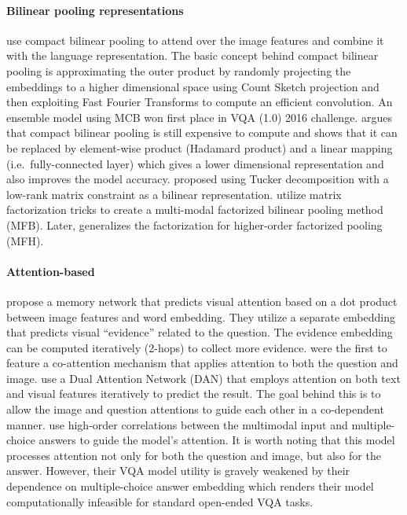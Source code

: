 \documentclass[times,twocolumn, final ,authoryear]{elsarticle}
\begin{document}
  \paragraph{Bilinear pooling representations}\citet{fukui2016} use compact bilinear pooling to attend over the image features and combine it with the language representation. The basic concept behind compact bilinear pooling is approximating
  the outer product by randomly projecting the embeddings to a higher
  dimensional space using Count Sketch projection \citep{charikar2004} and then exploiting
  Fast Fourier Transforms to compute an efficient convolution. An ensemble model using MCB won first place in VQA (1.0) 2016 challenge.
  \citet{kim2016b} argues that compact bilinear pooling is still expensive
  to compute and shows that it can be replaced by element-wise product (Hadamard product) and a linear mapping (i.e.\ fully-connected layer) which gives a lower dimensional representation and also improves the model accuracy.
  \citet{ben-younes2017} proposed using Tucker decomposition \citep{tucker1966} with a low-rank matrix constraint as a bilinear representation. \cite{yu2017a} utilize matrix factorization tricks to create a multi-modal factorized bilinear pooling method (MFB). Later, \cite{yu2017} generalizes the factorization for higher-order factorized pooling (MFH).
  
  \paragraph{Attention-based}
  \cite{xu2015} propose a memory network that predicts visual attention based on a dot product between image features and word embedding. They utilize a separate embedding that predicts visual ``evidence'' related to the question. The evidence embedding can be computed iteratively (2-hops) to collect more evidence.
  \citet{lu2016} were the first to feature
  a co-attention mechanism that applies attention to both the question
  and image. \citet{nam2016b} use a Dual Attention Network (DAN) that
  employs attention on both text and visual features iteratively to predict the result. The goal behind this is to allow the image and question attentions to guide each other in a co-dependent manner. \cite{schwartz2017} use high-order correlations between the multimodal input and multiple-choice answers to guide the model's attention. It is worth noting that this model processes attention not only for both the question and image, but also for the answer. However, their VQA model utility is gravely weakened by their dependence on multiple-choice answer embedding which renders their model computationally infeasible for standard open-ended VQA tasks.
\end{document}
